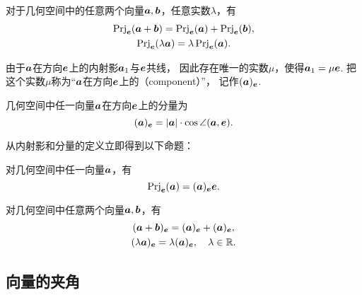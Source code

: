 \begin{theorem}
对于几何空间中的任意两个向量\(\boldsymbol{a},\boldsymbol{b}\)，任意实数\(\lambda\)，有\begin{gather}
	\operatorname{Prj}_{\boldsymbol{e}}(\boldsymbol{a}+\boldsymbol{b})
	= \operatorname{Prj}_{\boldsymbol{e}}(\boldsymbol{a})
	+ \operatorname{Prj}_{\boldsymbol{e}}(\boldsymbol{b}), \\
	\operatorname{Prj}_{\boldsymbol{e}}(\lambda \boldsymbol{a})
	= \lambda \operatorname{Prj}_{\boldsymbol{e}}(\boldsymbol{a}).
\end{gather}
\end{theorem}

由于\(\boldsymbol{a}\)在方向\(\boldsymbol{e}\)上的内射影\(\boldsymbol{a}_1\)与\(\boldsymbol{e}\)共线，
因此存在唯一的实数\(\mu\)，使得\(\boldsymbol{a}_1 = \mu \boldsymbol{e}\).
把这个实数\(\mu\)称为“\(\boldsymbol{a}\)在方向\(\boldsymbol{e}\)上的（component）”，
记作\((\boldsymbol{a})_{\boldsymbol{e}}\).

\begin{theorem}
几何空间中任一向量\(\boldsymbol{a}\)在方向\(\boldsymbol{e}\)上的分量为\begin{equation}
	(\boldsymbol{a})_{\boldsymbol{e}}
	= \abs{\boldsymbol{a}} \cdot \cos\angle(\boldsymbol{a},\boldsymbol{e}).
\end{equation}
\end{theorem}

从内射影和分量的定义立即得到以下命题：
\begin{theorem}
对几何空间中任一向量\(\boldsymbol{a}\)，有\[
	\operatorname{Prj}_{\boldsymbol{e}}(\boldsymbol{a})
	= (\boldsymbol{a})_{\boldsymbol{e}} \boldsymbol{e}.
\]
\end{theorem}

\begin{theorem}
对几何空间中任意两个向量\(\boldsymbol{a},\boldsymbol{b}\)，有\begin{gather}
	(\boldsymbol{a}+\boldsymbol{b})_{\boldsymbol{e}}
	= (\boldsymbol{a})_{\boldsymbol{e}}
	+ (\boldsymbol{a})_{\boldsymbol{e}}, \\
	(\lambda \boldsymbol{a})_{\boldsymbol{e}}
	= \lambda (\boldsymbol{a})_{\boldsymbol{e}},
	\quad\lambda\in\mathbb{R}.
\end{gather}
\end{theorem}

\subsection{向量的夹角}

